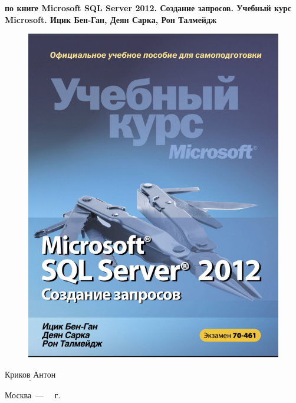 \begin{titlepage}
	\begin{center}
		\Large\textbf{\newline{} по книге Microsoft SQL Server 2012. Создание запросов. Учебный курс Microsoft. Ицик Бен-Ган, Деян Сарка, Рон Талмейдж}\newline\newline
	\end{center}


	\begin{figure}
		\includegraphics[width=0.4\linewidth]{img/book.png}
		\centering		
	\end{figure}



	\noindent\textbf{\newline\newline\newline\newline\newline{}} $\underline{\text{Криков Антон}}$\newline\newline
	
	\begin{center}
		\vfill
		Москва~---~\the\year
		~г.
	\end{center}
 \restoregeometry
\end{titlepage} 
